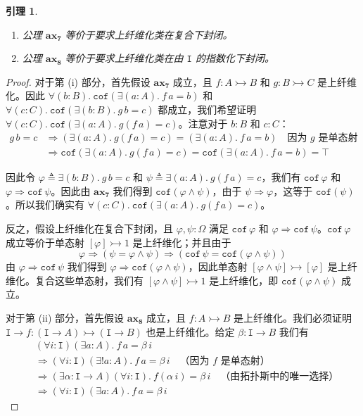 \documentclass{ctexrep}
\theoremstyle{plain}
\newtheorem{lemma}[theorem]{引理}
\theoremstyle{definition}
\theoremstyle{remark}
\newcommand{\ax}[1]{\mathbf{ax_{#1}}}
\begin{document}
\begin{lemma}
\begin{enumerate}
\item[(i)] 公理 $\ax{7}$ 等价于要求上纤维化类在复合下封闭。
\item[(ii)] 公理 $\ax{8}$ 等价于要求上纤维化类在由 $\mathtt{I}$ 的指数化下封闭。
\end{enumerate}
\end{lemma}

\begin{proof}
对于第 (i) 部分，首先假设 $\ax{7}$ 成立，且 $f : A \rightarrowtail B$ 和 $g : B \rightarrowtail C$ 是上纤维化。因此 $\forall(b : B).\ \mathtt{cof}(\exists(a : A).\ f\,a = b)$ 和 $\forall(c : C).\ \mathtt{cof}(\exists(b : B).\ g\,b = c)$ 都成立，我们希望证明 $\forall(c : C).\ \mathtt{cof}(\exists(a : A).\ g(f\,a) = c)$。注意对于 $b : B$ 和 $c : C$：
\begin{align*}
g\,b = c &\Rightarrow (\exists(a : A).\ g(f\,a) = c) = (\exists(a : A).\ f\,a = b) \quad \text{因为 } g \text{ 是单态射} \\
&\Rightarrow \mathtt{cof}(\exists(a : A).\ g(f\,a) = c) = \mathtt{cof}(\exists(a : A).\ f\,a = b) = \top
\end{align*}

因此令 $\varphi \triangleq \exists(b : B).\ g\,b = c$ 和 $\psi \triangleq \exists(a : A).\ g(f\,a) = c$，我们有 $\mathtt{cof}\,\varphi$ 和 $\varphi \Rightarrow \mathtt{cof}\,\psi$。因此由 $\ax{7}$ 我们得到 $\mathtt{cof}(\varphi \land \psi)$，由于 $\psi \Rightarrow \varphi$，这等于 $\mathtt{cof}(\psi)$。所以我们确实有 $\forall(c : C).\ \mathtt{cof}(\exists(a : A).\ g(f\,a) = c)$。

反之，假设上纤维化在复合下封闭，且 $\varphi, \psi : \Omega$ 满足 $\mathtt{cof}\,\varphi$ 和 $\varphi \Rightarrow \mathtt{cof}\,\psi$。$\mathtt{cof}\,\varphi$ 成立等价于单态射 $[\varphi] \rightarrowtail 1$ 是上纤维化；并且由于
\[
\varphi \Rightarrow (\psi = \varphi \land \psi) \Rightarrow (\mathtt{cof}\,\psi = \mathtt{cof}(\varphi \land \psi))
\]
由 $\varphi \Rightarrow \mathtt{cof}\,\psi$ 我们得到 $\varphi \Rightarrow \mathtt{cof}(\varphi \land \psi)$，因此单态射 $[\varphi \land \psi] \rightarrowtail [\varphi]$ 是上纤维化。复合这些单态射，我们有 $[\varphi \land \psi] \rightarrowtail 1$ 是上纤维化，即 $\mathtt{cof}(\varphi \land \psi)$ 成立。

对于第 (ii) 部分，首先假设 $\ax{8}$ 成立，且 $f : A \rightarrowtail B$ 是上纤维化。我们必须证明 $\mathtt{I} \to f : (\mathtt{I} \to A) \rightarrowtail (\mathtt{I} \to B)$ 也是上纤维化。给定 $\beta : \mathtt{I} \to B$ 我们有
\begin{align*}
&(\forall i : \mathtt{I})(\exists a : A).\ f\,a = \beta\,i \\
&\Rightarrow (\forall i : \mathtt{I})(\exists! a : A).\ f\,a = \beta\,i \quad \text{（因为 } f \text{ 是单态射）} \\
&\Rightarrow (\exists \alpha : \mathtt{I} \to A)(\forall i : \mathtt{I}).\ f(\alpha\,i) = \beta\,i \quad \text{（由拓扑斯中的唯一选择）} \\
&\Rightarrow (\forall i : \mathtt{I})(\exists a : A).\ f\,a = \beta\,i
\end{align*}


\end{proof}
\end{document}
